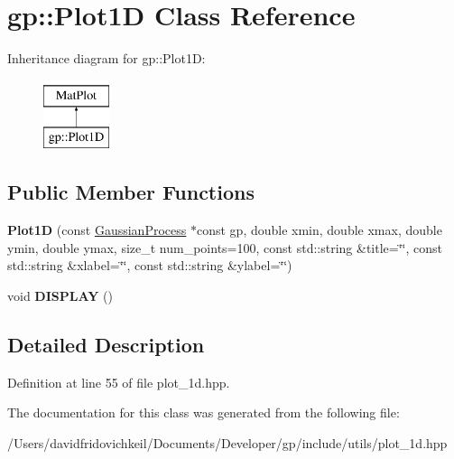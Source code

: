 \hypertarget{classgp_1_1_plot1_d}{}\section{gp\+:\+:Plot1D Class Reference}
\label{classgp_1_1_plot1_d}
Inheritance diagram for gp\+:\+:Plot1D\+:\begin{figure}[H]
\begin{center}
\leavevmode
\includegraphics[height=2.000000cm]{classgp_1_1_plot1_d}
\end{center}
\end{figure}
\subsection*{Public Member Functions}
\begin{DoxyCompactItemize}
\item 
\hypertarget{classgp_1_1_plot1_d_a1f37c38e062adebdfad1c8e3f242109e}{}\label{classgp_1_1_plot1_d_a1f37c38e062adebdfad1c8e3f242109e} 
{\bfseries Plot1D} (const \hyperlink{classgp_1_1_gaussian_process}{Gaussian\+Process} $\ast$const gp, double xmin, double xmax, double ymin, double ymax, size\+\_\+t num\+\_\+points=100, const std\+::string \&title=\char`\"{}\char`\"{}, const std\+::string \&xlabel=\char`\"{}\char`\"{}, const std\+::string \&ylabel=\char`\"{}\char`\"{})
\item 
\hypertarget{classgp_1_1_plot1_d_a63c88cd7b1231277a0f19208516f07dd}{}\label{classgp_1_1_plot1_d_a63c88cd7b1231277a0f19208516f07dd} 
void {\bfseries D\+I\+S\+P\+L\+AY} ()
\end{DoxyCompactItemize}


\subsection{Detailed Description}


Definition at line 55 of file plot\+\_\+1d.\+hpp.



The documentation for this class was generated from the following file\+:\begin{DoxyCompactItemize}
\item 
/\+Users/davidfridovichkeil/\+Documents/\+Developer/gp/include/utils/plot\+\_\+1d.\+hpp\end{DoxyCompactItemize}
